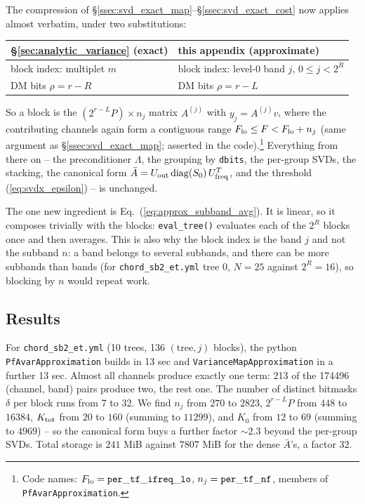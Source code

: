 \documentclass{article}
\numberwithin{equation}{section}   %
\begin{document}
The compression of \S\ref{ssec:svd_exact_map}--\S\ref{ssec:svd_exact_cost} now applies almost
verbatim, under two substitutions:
\begin{center}
\begin{tabular}{ll}
\S\ref{sec:analytic_variance} (exact) & this appendix (approximate) \\
\hline
block index: multiplet $m$            & block index: level-0 band $j$, $0 \le j < 2^R$ \\
DM bits $\rho = r-R$                  & DM bits $\rho = r-L$ \\
\end{tabular}
\end{center}
So a block is the $(2^{r-L}P) \times n_j$ matrix $A^{(j)}$ with $y_j = A^{(j)} v$, where the
contributing channels again form a contiguous range $F_{\rm lo} \le F < F_{\rm lo} + n_j$
(same argument as \S\ref{ssec:svd_exact_map}; asserted in the code).\footnote{Code names:
$F_{\rm lo} = {\tt per\_tf\_ifreq\_lo}$, $n_j = {\tt per\_tf\_nf}$, members of
{\tt PfAvarApproximation}.} Everything from there on -- the preconditioner
$\Lambda$, the grouping by {\tt dbits}, the per-group SVDs, the stacking, the canonical form
$\bar A = U_{\rm out}\,{\rm diag}(S_0)\,U_{\rm freq}^T$, and the threshold
(\ref{eq:svdx_epsilon}) -- is unchanged.

The one new ingredient is Eq.\ (\ref{eq:approx_subband_avg}). It is linear, so it composes
trivially with the blocks: {\tt eval\_tree()} evaluates each of the $2^R$ blocks once and then
averages. This is also why the block index is the band $j$ and not the subband $n$: a band
belongs to several subbands, and there can be more subbands than bands (for
{\tt chord\_sb2\_et.yml} tree 0, $N = 25$ against $2^R = 16$), so blocking by $n$ would repeat
work.

\subsection{Results}
\label{ssec:approx_results}

For {\tt chord\_sb2\_et.yml} (10 trees, 136 $(\mbox{tree}, j)$ blocks), the python
{\tt PfAvarApproximation} builds in 13 sec and {\tt VarianceMapApproximation} in a further
13 sec. Almost all channels produce exactly one term: 213 of the 174496 (channel, band) pairs
produce two, the rest one. The number of distinct bitmasks $\delta$ per block runs from 7 to 32.
We find $n_j$ from $270$ to $2823$, $2^{r-L}P$ from $448$ to $16384$, $K_{\rm tot}$ from $20$ to
$160$ (summing to $11299$), and $K_0$ from $12$ to $69$ (summing to $4969$) -- so the canonical
form buys a further factor $\sim\!2.3$ beyond the per-group SVDs. Total storage is $241$ MiB
against $7807$ MiB for the dense $\bar A$'s, a factor $32$.
\end{document}

